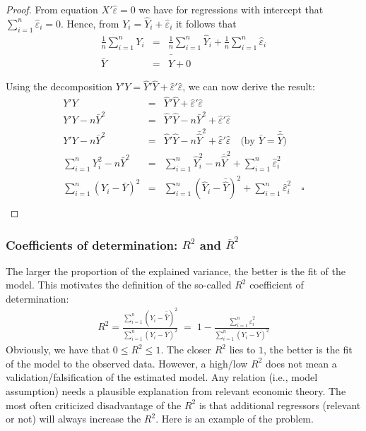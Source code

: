 \documentclass[
  letterpaper,
  DIV=11,
  numbers=noendperiod]{scrreprt}
\theoremstyle{definition}
\theoremstyle{plain}
\theoremstyle{plain}
\theoremstyle{remark}
\begin{document}
\begin{proof}

From equation \(X'\hat\varepsilon=0\) we have for regressions with
intercept that \(\sum_{i=1}^n\hat\varepsilon_i=0\). Hence, from
\(Y_i=\hat{Y}_i+\hat\varepsilon_i\) it follows that \begin{eqnarray*}
  \frac{1}{n}\sum_{i=1}^n Y_i&=&\frac{1}{n}\sum_{i=1}^n \hat{Y}_i+\frac{1}{n}\sum_{i=1}^n \hat\varepsilon_i\\
  \bar{Y}&=&\bar{\hat{Y}}+0
\end{eqnarray*}

Using the decomposition
\(Y'Y=\hat{Y}'\hat{Y}+\hat\varepsilon'\hat\varepsilon\), we can now
derive the result: \begin{eqnarray*}
   Y'Y&=&\hat{Y}'\hat{Y}+\hat\varepsilon'\hat\varepsilon\\
   Y'Y-n\bar{Y}^2&=&\hat{Y}'\hat{Y}-n\bar{Y}^2+\hat\varepsilon'\hat\varepsilon\\
   Y'Y-n\bar{Y}^2&=&\hat{Y}'\hat{Y}-n\bar{\hat{Y}}^2+\hat\varepsilon'\hat\varepsilon\quad\text{(by $\bar{Y}=\bar{\hat{Y}}$)}\\
   \sum_{i=1}^nY_i^2-n\bar{Y}^2&=&\sum_{i=1}^n\hat{Y}_i^2-n\bar{\hat{Y}}^2+\sum_{i=1}^n\hat\varepsilon_i^2\\
   \sum_{i=1}^n(Y_i-\bar{Y})^2&=&\sum_{i=1}^n(\hat{Y}_i-\bar{\hat{Y}})^2+\sum_{i=1}^n\hat\varepsilon_i^2\quad\square\\
\end{eqnarray*}

\end{proof}

\hypertarget{coefficients-of-determination-r2-and-overliner2}{%
\subsubsection*{\texorpdfstring{Coefficients of determination: \(R^2\)
and
\(\overline{R}^2\)}{Coefficients of determination: R\^{}2 and \textbackslash overline\{R\}\^{}2}}\label{coefficients-of-determination-r2-and-overliner2}}

The larger the proportion of the explained variance, the better is the
fit of the model. This motivates the definition of the so-called \(R^2\)
coefficient of determination: \begin{eqnarray*}
R^2=\frac{\sum_{i=1}^n\left(\hat{Y}_i-\bar{\hat{Y}}\right)^2}{\sum_{i=1}^n\left(Y_i-\bar{Y}\right)^2}\;=\;1-\frac{\sum_{i=1}^n\hat{\varepsilon}_i^2}{\sum_{i=1}^n\left(Y_i-\bar{Y}\right)^2}
\end{eqnarray*} Obviously, we have that \(0\leq R^2\leq 1\). The closer
\(R^2\) lies to \(1\), the better is the fit of the model to the
observed data. However, a high/low \(R^2\) does not mean a
validation/falsification of the estimated model. Any relation (i.e.,
model assumption) needs a plausible explanation from relevant economic
theory. The most often criticized disadvantage of the \(R^2\) is that
additional regressors (relevant or not) will always increase the
\(R^2\). Here is an example of the problem.
\end{document}
